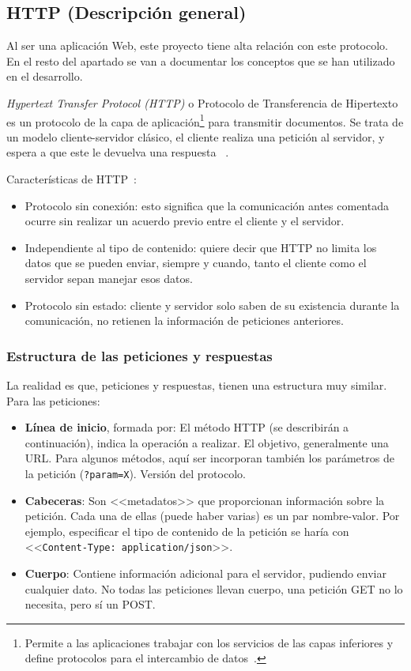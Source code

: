 \subsection{HTTP (Descripción general)}

Al ser una aplicación Web, este proyecto tiene alta relación con este protocolo.
En el resto del apartado se van a documentar los conceptos que se han utilizado
en el desarrollo.

\emph{Hypertext Transfer Protocol (HTTP)} o Protocolo de Transferencia de
Hipertexto es un protocolo de la capa de aplicación\footnote{Permite a las
aplicaciones trabajar con los servicios de las capas inferiores y define
protocolos para el intercambio de datos~\cite{eswiki:149372346}.} para
transmitir documentos. Se trata de un modelo cliente-servidor clásico, el
cliente realiza una petición al servidor, y espera a que este le devuelva una
respuesta ~\cite{http:mdn}.



Características de HTTP~\cite{http:features}:
\begin{itemize}
	\item Protocolo sin conexión: esto significa que la comunicación antes
	comentada ocurre sin realizar un acuerdo previo entre el cliente y el
	servidor.
	\item Independiente al tipo de contenido: quiere decir que HTTP no limita
	los datos que se pueden enviar, siempre y cuando, tanto el cliente como el
	servidor sepan manejar esos datos.
	\item Protocolo sin estado: cliente y servidor solo saben de su existencia
	durante la comunicación, no retienen la información de peticiones
	anteriores.
\end{itemize}


\subsubsection{Estructura de las peticiones y respuestas}

La realidad es que, peticiones y respuestas, tienen una estructura muy similar. Para las peticiones:
\begin{itemize}
	\item \textbf{Línea de inicio}, formada por:
  \subitem El método HTTP (se describirán a continuación), indica la operación a realizar.
  \subitem El objetivo, generalmente una URL. Para algunos métodos, aquí ser
  incorporan también los parámetros de la petición (\texttt{?param=X}).
  \subitem Versión del protocolo.
	\item \textbf{Cabeceras}: Son <<metadatos>> que proporcionan información sobre la
  petición. Cada una de ellas (puede haber varias) es un par nombre-valor.	Por
  ejemplo, especificar el tipo de contenido de la petición se haría con
  <<\texttt{Content-Type: application/json}>>.
  \item \textbf{Cuerpo}: Contiene información adicional para el servidor, pudiendo enviar
  cualquier dato. No todas las peticiones llevan cuerpo, una petición GET no lo
  necesita, pero sí un POST.
\end{itemize}

